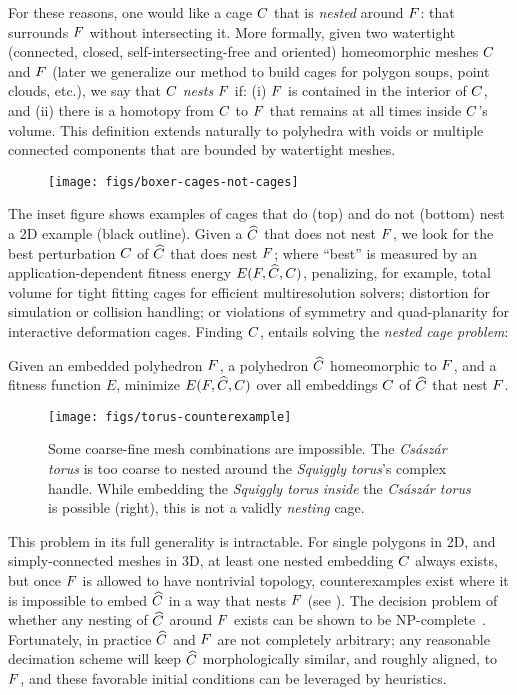 For these reasons, one would like a cage $C$ that is \emph{nested} around
$F$: that surrounds $F$ without intersecting it. More formally, given
two watertight (connected, closed, self-intersecting-free and oriented)
homeomorphic meshes 
%
$C$ and $F$ (later we generalize our method to build cages for polygon
soups, point clouds, etc.), we say that $C$ \emph{nests} $F$ if: 
%
(i) $F$ is contained in the interior of $C$, and 
%
(ii) there is a homotopy from $C$ to $F$ that remains at all times inside
$C$'s volume. 
This definition extends naturally to polyhedra with voids or multiple connected components that are bounded by watertight meshes.
\clearpage

\begin{wrapfigure}[15]{r}{1.02in}
%
\centering
%
\texttt{[image: figs/boxer-cages-not-cages]}
%
\end{wrapfigure}
%
The inset figure shows examples of cages that do (top) and do not (bottom) nest
a 2D example (black outline). Given a $\widehat{C}$ that does not nest $F$, we
look for the best perturbation $C$ of $\widehat{C}$ that does nest $F$; where
``best'' is measured by an application-dependent fitness energy $E(F,
\widehat{C}, C)$, penalizing, for example, total volume for tight fitting cages
for efficient multiresolution solvers; distortion for simulation or collision
handling; or violations of symmetry and quad-planarity for interactive
deformation cages.  Finding $C$,  entails solving the \emph{nested cage
problem}:

Given an embedded polyhedron $F$, a polyhedron $\widehat{C}$ homeomorphic to $F$, and a
fitness function $E$, minimize $E(F, \widehat{C}, C)$ over all embeddings
$C$ of $\widehat{C}$ that nest $F$.


\begin{figure}
  \texttt{[image: figs/torus-counterexample]}
  \caption{Some coarse-fine mesh combinations are impossible. The
  \emph{Cs\'asz\'ar torus} is too coarse to nested around the
  \emph{Squiggly torus}'s complex handle. While embedding the \emph{Squiggly
  torus} \emph{inside} the \emph{Cs\'asz\'ar torus} is possible (right), this
  is not a validly \emph{nesting} cage.}
  \label{fig:torus-counterexample}
\end{figure}

This problem in its full generality is intractable. For
single polygons in 2D, and simply-connected meshes in 3D, at least one nested
embedding $C$ always exists, but once $F$ is allowed to have nontrivial
topology, counterexamples exist where it is impossible to embed $\widehat{C}$ in a way
that nests $F$ (see ). The decision
problem of whether any nesting of $\widehat{C}$ around $F$ exists can be 
shown to be NP-complete~\cite{CagesNP}.
Fortunately, in practice $\widehat{C}$ and $F$ are not completely arbitrary; any
reasonable decimation scheme will keep $\widehat{C}$ morphologically similar, and
roughly aligned, to $F$, and these favorable initial conditions can be
leveraged by heuristics.

